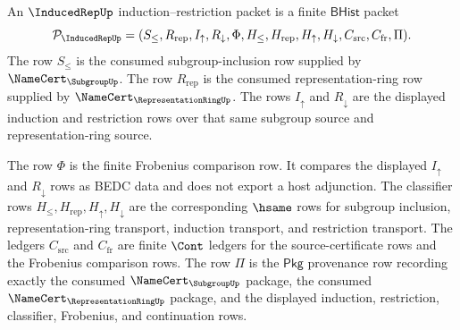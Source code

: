 \begin{definition}
\label{def:inducedrep-induction-restriction-packet}
An $\InducedRepUp$ induction--restriction packet is a finite
$\mathsf{BHist}$ packet
$$
\mathcal{P}_{\InducedRepUp}=(S_{\leq},R_{\mathrm{rep}},I_{\uparrow},
R_{\downarrow},\Phi,H_{\leq},H_{\mathrm{rep}},H_{\uparrow},H_{\downarrow},
C_{\mathrm{src}},C_{\mathrm{fr}},\Pi).
$$
The row $S_{\leq}$ is the consumed subgroup-inclusion row supplied by
$\NameCert_{\SubgroupUp}$. The row $R_{\mathrm{rep}}$ is the consumed
representation-ring row supplied by $\NameCert_{\RepresentationRingUp}$.
The rows $I_{\uparrow}$ and $R_{\downarrow}$ are the displayed induction and
restriction rows over that same subgroup source and representation-ring
source.

The row $\Phi$ is the finite Frobenius comparison row. It compares the
displayed $I_{\uparrow}$ and $R_{\downarrow}$ rows as BEDC data and does not
export a host adjunction. The classifier rows
$H_{\leq},H_{\mathrm{rep}},H_{\uparrow},H_{\downarrow}$ are the corresponding
$\hsame$ rows for subgroup inclusion, representation-ring transport,
induction transport, and restriction transport. The ledgers
$C_{\mathrm{src}}$ and $C_{\mathrm{fr}}$ are finite $\Cont$ ledgers for the
source-certificate rows and the Frobenius comparison rows. The row $\Pi$ is
the $\mathsf{Pkg}$ provenance row recording exactly the consumed
$\NameCert_{\SubgroupUp}$ package, the consumed
$\NameCert_{\RepresentationRingUp}$ package, and the displayed induction,
restriction, classifier, Frobenius, and continuation rows.
\end{definition}

